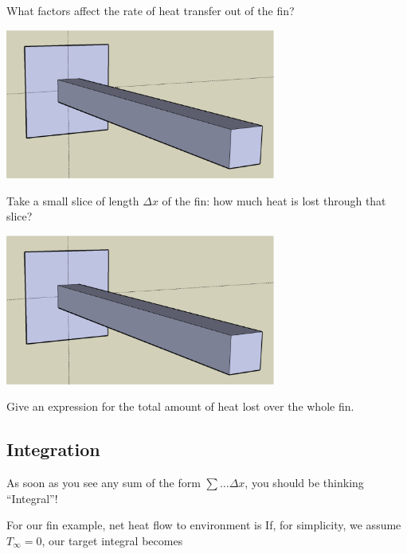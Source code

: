 \newpage
\vsc
\problem What factors affect the rate of heat transfer out of the
  fin?

\begin{center}
\includegraphics[width=3.5in]{graphics/notes_06_LongPin3D}
\end{center}

\vfill
\vfill

\newpage

\problem Take a small slice of length $\Delta x$ of the fin: how much
  heat is lost through that slice?
\begin{center}
\includegraphics[width=3.5in]{graphics/notes_06_LongPin3D}
\end{center}

\vfill

Give an expression for the total amount of heat lost over
  the whole fin.

\vfill
\vfill


\newpage


\subsection*{Integration}

As soon as you see any sum of the form $\sum \ldots \Delta x$, you
should be thinking ``Integral''!

For our fin example, net heat flow to environment is
\vfill
If, for simplicity, we assume $T_{\infty} = 0$, our target integral becomes
\vfill

